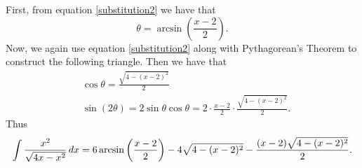 \documentclass[]{ximera}
\begin{document}
\begin{problem}
\begin{freeResponse}
	First, from equation \eqref{substitution2} we have that
		\[
		\theta = \arcsin \left( \frac{x-2}{2} \right).
		\]
	Now, we again use equation \eqref{substitution2} along with Pythagorean's Theorem to construct the following triangle.
	Then we have that
		\begin{align*}
		&\cos \theta = \frac{\sqrt{4-(x-2)^2}}{2}  \\
		&\sin(2\theta) = 2 \sin \theta \cos \theta = 2 \cdot \frac{x-2}{2} \cdot \frac{\sqrt{4-(x-2)^2}}{2}.
		\end{align*}
	Thus
		\[
		\int \frac{x^2}{\sqrt{4x-x^2}} \,d x = 6\arcsin \left( \frac{x-2}{2} \right) - 4\sqrt{4-(x-2)^2} - \frac{(x-2)\sqrt{4-(x-2)^2}}{2}.
		\]
	\end{freeResponse}

\end{problem}

\begin{instructorNotes}

\end{instructorNotes}
\end{document}
